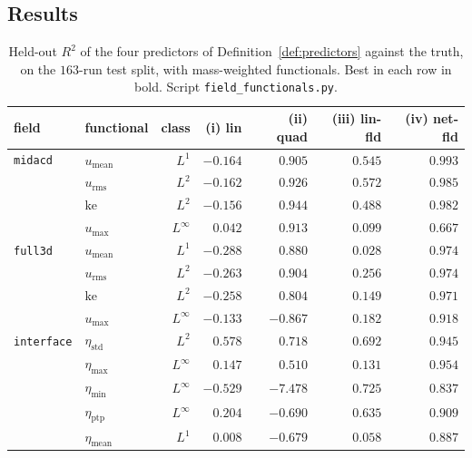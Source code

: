 \documentclass[11pt,a4paper]{article}
\theoremstyle{plain}
\theoremstyle{definition}
\theoremstyle{remark}
\begin{document}
\subsection{Results}
\label{sec:results}

\begin{table}[t]
\centering
\small
\begin{tabular}{@{}llrrrrr@{}}
\toprule
field & functional & class & (i) lin & (ii) quad & (iii) lin-fld & (iv) net-fld \\
\midrule
\texttt{midacd}
 & $u_{\mathrm{mean}}$ & $L^1$      & $-0.164$ & $0.905$ & $0.545$ & $\mathbf{0.993}$ \\
 & $u_{\mathrm{rms}}$  & $L^2$      & $-0.162$ & $0.926$ & $0.572$ & $\mathbf{0.985}$ \\
 & $\mathrm{ke}$       & $L^2$      & $-0.156$ & $0.944$ & $0.488$ & $\mathbf{0.982}$ \\
 & $u_{\max}$          & $L^\infty$ & $0.042$  & $\mathbf{0.913}$ & $0.099$ & $0.667$ \\
\midrule
\texttt{full3d}
 & $u_{\mathrm{mean}}$ & $L^1$      & $-0.288$ & $0.880$ & $0.028$ & $\mathbf{0.974}$ \\
 & $u_{\mathrm{rms}}$  & $L^2$      & $-0.263$ & $0.904$ & $0.256$ & $\mathbf{0.974}$ \\
 & $\mathrm{ke}$       & $L^2$      & $-0.258$ & $0.804$ & $0.149$ & $\mathbf{0.971}$ \\
 & $u_{\max}$          & $L^\infty$ & $-0.133$ & $-0.867$ & $0.182$ & $\mathbf{0.918}$ \\
\midrule
\texttt{interface}
 & $\eta_{\mathrm{std}}$ & $L^2$      & $0.578$  & $0.718$  & $0.692$ & $\mathbf{0.945}$ \\
 & $\eta_{\max}$         & $L^\infty$ & $0.147$  & $0.510$  & $0.131$ & $\mathbf{0.954}$ \\
 & $\eta_{\min}$         & $L^\infty$ & $-0.529$ & $-7.478$ & $0.725$ & $\mathbf{0.837}$ \\
 & $\eta_{\mathrm{ptp}}$ & $L^\infty$ & $0.204$  & $-0.690$ & $0.635$ & $\mathbf{0.909}$ \\
 & $\eta_{\mathrm{mean}}$& $L^1$      & $0.008$  & $-0.679$ & $0.058$ & $\mathbf{0.887}$ \\
\bottomrule
\end{tabular}
\caption{Held-out $R^2$ of the four predictors of Definition~\ref{def:predictors}
against the truth, on the $163$-run test split, with mass-weighted
functionals. Best in each row in bold. Script
\texttt{field\_functionals.py}.}
\label{tab:main}
\end{table}
\end{document}
